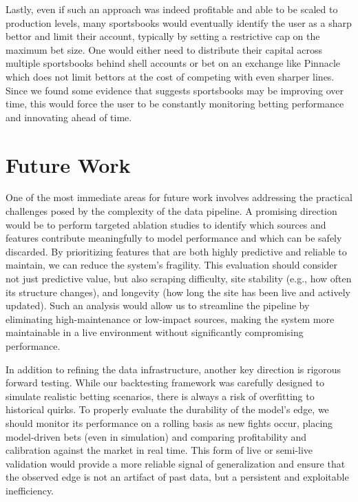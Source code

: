 \documentclass[12pt,twoside]{report}
\begin{document}
Lastly, even if such an approach was indeed profitable and able to be scaled to production levels, many sportsbooks would eventually identify the user as a sharp bettor and limit their account, typically by setting a restrictive cap on the maximum bet size. One would either need to distribute their capital across multiple sportsbooks behind shell accounts or bet on an exchange like Pinnacle which does not limit bettors at the cost of competing with even sharper lines. Since we found some evidence that suggests sportsbooks may be improving over time, this would force the user to be constantly monitoring betting performance and innovating ahead of time.

\section{Future Work}

One of the most immediate areas for future work involves addressing the practical challenges posed by the complexity of the data pipeline. A promising direction would be to perform targeted ablation studies to identify which sources and features contribute meaningfully to model performance and which can be safely discarded. By prioritizing features that are both highly predictive and reliable to maintain, we can reduce the system’s fragility. This evaluation should consider not just predictive value, but also scraping difficulty, site stability (e.g., how often its structure changes), and longevity (how long the site has been live and actively updated). Such an analysis would allow us to streamline the pipeline by eliminating high-maintenance or low-impact sources, making the system more maintainable in a live environment without significantly compromising performance.

In addition to refining the data infrastructure, another key direction is rigorous forward testing. While our backtesting framework was carefully designed to simulate realistic betting scenarios, there is always a risk of overfitting to historical quirks. To properly evaluate the durability of the model's edge, we should monitor its performance on a rolling basis as new fights occur, placing model-driven bets (even in simulation) and comparing profitability and calibration against the market in real time. This form of live or semi-live validation would provide a more reliable signal of generalization and ensure that the observed edge is not an artifact of past data, but a persistent and exploitable inefficiency.
\end{document}

